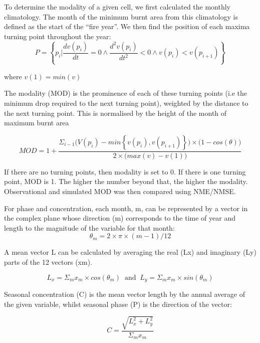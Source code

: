 \documentclass[bg, manuscript]{copernicus}
\begin{document}
To determine the modality of a given cell, we first calculated the monthly climatology. The month of the minimum burnt area from this climatology is defined as the start of the “fire year”. We then find the position of each maxima turning point throughout the year:	
\begin{equation}

    P = \left\{p_i | \frac{dv(p_i)}{dt} = 0 \wedge \frac{d^2v(p_i)}{dt^2} < 0 \wedge v(p_i) < v(p_{i+1}) \right\}

\end{equation}

where $v(1) = min(v)$

The modality (MOD) is the prominence of each of these turning points (i.e the minimum drop required to the next turning point), weighted by the distance to the next turning point. This is normalised by the height of the month of maximum burnt area

\begin{equation}
    MOD =1 + \frac{ \Sigma_{i-1} \big( V(p_i) - min\left\{ v(p_i), v(p_{i+1}) \right\} \big) \times \big( 1 - cos(\theta) \big)}{2 \times \big(max(v) - v(1) \big)}
\end{equation}

If there are no turning points, then modality is set to 0. If there is one turning point, MOD is 1. The higher the number beyond that, the higher the modality. Observational and simulated MOD  was then compared using NME/NMSE.

For phase and concentration, each month, m, can be represented by a vector in the complex plane whose direction (m) corresponds to the time of year and length to the magnitude of the variable for that month:
\begin{equation}
    \theta_m = 2 \times \pi \times (m-1) / 12
\end{equation}

A mean vector L can be calculated by averaging the real (Lx) and imaginary (Ly) parts of the 12 vectors (xm).

\begin{equation}
    L_x = \Sigma_m x_m \times cos(\theta_m) \ \text{   and   } \
    L_y = \Sigma_m x_m \times sin(\theta_m)
\end{equation}

Seasonal concentration (C) is the mean vector length by the annual average of the given variable, whilst seasonal phase (P) is the direction of the vector:

\begin{equation}
    C = \frac{\sqrt{L_x^2 + L_y^2}}{\Sigma_m x_m}
\end{equation}
\end{document}
